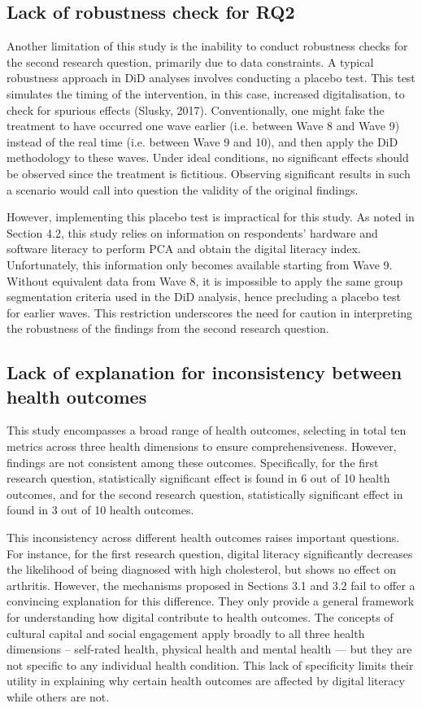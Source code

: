 \subsection{Lack of robustness check for RQ2}
Another limitation of this study is the inability to conduct robustness checks for the second research question, primarily due to data constraints. A typical robustness approach in DiD analyses involves conducting a placebo test. This test simulates the timing of the intervention, in this case, increased digitalisation, to check for spurious effects (Slusky, 2017). Conventionally, one might fake the treatment to have occurred one wave earlier (i.e. between Wave 8 and Wave 9) instead of the real time (i.e. between Wave 9 and 10), and then apply the DiD methodology to these waves. Under ideal conditions, no significant effects should be observed since the treatment is fictitious. Observing significant results in such a scenario would call into question the validity of the original findings.

However, implementing this placebo test is impractical for this study. As noted in Section 4.2, this study relies on information on respondents' hardware and software literacy to perform PCA and obtain the digital literacy index. Unfortunately, this information only becomes available starting from Wave 9. Without equivalent data from Wave 8, it is impossible to apply the same group segmentation criteria used in the DiD analysis, hence precluding a placebo test for earlier waves. This restriction underscores the need for caution in interpreting the robustness of the findings from the second research question.

\subsection{Lack of explanation for inconsistency between health outcomes}
This study encompasses a broad range of health outcomes, selecting in total ten metrics across three health dimensions to ensure comprehensiveness. However, findings are not consistent among these outcomes. Specifically, for the first research question, statistically significant effect is found in 6 out of 10 health outcomes, and for the second research question, statistically significant effect in found in 3 out of 10 health outcomes.

This inconsistency across different health outcomes raises important questions. For instance, for the first research question, digital literacy significantly decreases the likelihood of being diagnosed with high cholesterol, but shows no effect on arthritis. However, the mechanisms proposed in Sections 3.1 and 3.2 fail to offer a convincing explanation for this difference. They only provide a general framework for understanding how digital contribute to health outcomes. The concepts of cultural capital and social engagement apply broadly to all three health dimensions – self-rated health, physical health and mental health — but they are not specific to any individual health condition. This lack of specificity limits their utility in explaining why certain health outcomes are affected by digital literacy while others are not.

